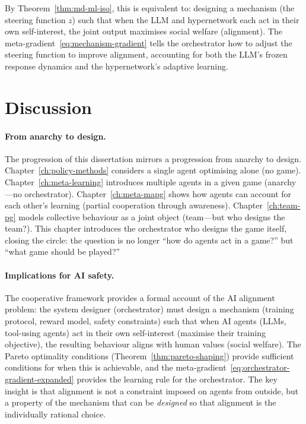 By Theorem~\ref{thm:md-ml-iso}, this is equivalent to: designing a mechanism (the steering function $z$) such that when the LLM and hypernetwork each act in their own self-interest, the joint output maximises social welfare (alignment). The meta-gradient~\eqref{eq:mechanism-gradient} tells the orchestrator how to adjust the steering function to improve alignment, accounting for both the LLM's frozen response dynamics and the hypernetwork's adaptive learning.

\section{Discussion}
\label{sec:ch9-discussion}

\paragraph{From anarchy to design.} The progression of this dissertation mirrors a progression from anarchy to design. Chapter~\ref{ch:policy-methods} considers a single agent optimising alone (no game). Chapter~\ref{ch:meta-learning} introduces multiple agents in a given game (anarchy---no orchestrator). Chapter~\ref{ch:meta-mapg} shows how agents can account for each other's learning (partial cooperation through awareness). Chapter~\ref{ch:team-pg} models collective behaviour as a joint object (team---but who designs the team?). This chapter introduces the orchestrator who designs the game itself, closing the circle: the question is no longer ``how do agents act in a game?'' but ``what game should be played?''

\paragraph{Implications for AI safety.} The cooperative framework provides a formal account of the AI alignment problem: the system designer (orchestrator) must design a mechanism (training protocol, reward model, safety constraints) such that when AI agents (LLMs, tool-using agents) act in their own self-interest (maximise their training objective), the resulting behaviour aligns with human values (social welfare). The Pareto optimality conditions (Theorem~\ref{thm:pareto-shaping}) provide sufficient conditions for when this is achievable, and the meta-gradient~\eqref{eq:orchestrator-gradient-expanded} provides the learning rule for the orchestrator. The key insight is that alignment is not a constraint imposed on agents from outside, but a property of the mechanism that can be \emph{designed} so that alignment is the individually rational choice.
